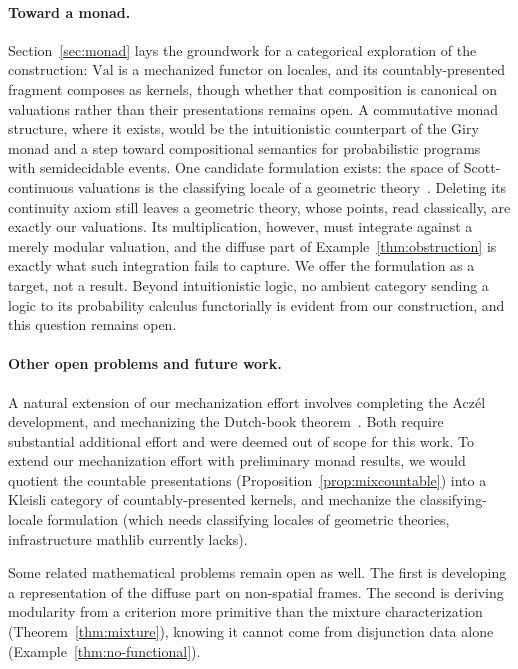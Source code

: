 \paragraph{Toward a monad.}
Section~\ref{sec:monad} lays the groundwork for a categorical
exploration of the construction: $\mathrm{Val}$ is a mechanized
functor on locales, and its countably-presented fragment composes as
kernels, though whether that composition is canonical on valuations
rather than their presentations remains open.
A commutative monad structure, where it exists, would be the
intuitionistic counterpart of the Giry monad and a step toward
compositional semantics for probabilistic programs with
semidecidable events.  One candidate formulation exists: the space
of Scott-continuous valuations is the classifying locale of a
geometric theory~\cite{vickers2008,coquand-spitters2009}.
Deleting its continuity axiom still leaves a geometric theory, whose
points, read classically, are exactly our valuations.  Its multiplication,
however, must integrate against a merely modular valuation, and the
diffuse part of Example~\ref{thm:obstruction} is exactly what such
integration fails to capture.  We offer the formulation as a
target, not a result.
Beyond intuitionistic logic, no ambient category sending a logic to
its probability calculus functorially is evident from our
construction, and this question remains open.


\paragraph{Other open problems and future work.}
A natural extension of our mechanization effort involves
completing the Acz\'el development, and mechanizing the
Dutch-book theorem~\cite{weatherson2003}. Both require substantial 
additional effort and were deemed out of scope for this work. 
To extend our mechanization effort with preliminary monad 
results, we would quotient the countable
presentations (Proposition~\ref{prop:mixcountable}) into a Kleisli
category of countably-presented kernels, and mechanize the
classifying-locale formulation (which needs classifying locales of
geometric theories, infrastructure \textsf{mathlib} currently lacks).

Some related mathematical problems remain open as well.
The first is developing a representation of the diffuse part on
non-spatial frames. The second is deriving modularity from a 
criterion more primitive than the
mixture characterization (Theorem~\ref{thm:mixture}), knowing it
cannot come from disjunction data alone
(Example~\ref{thm:no-functional}).

